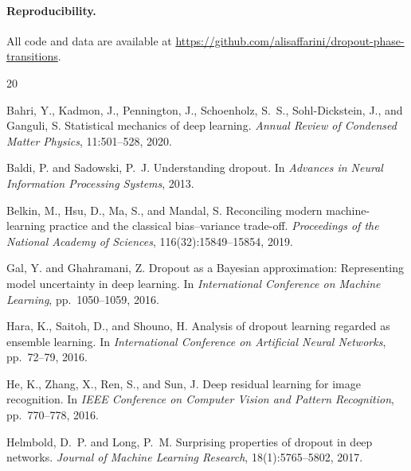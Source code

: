 \documentclass{article}
\begin{document}
\paragraph{Reproducibility.} All code and data are available at \url{https://github.com/alisaffarini/dropout-phase-transitions}.




\begin{thebibliography}{20}

Bahri, Y., Kadmon, J., Pennington, J., Schoenholz, S.~S., Sohl-Dickstein, J., and Ganguli, S.
\newblock Statistical mechanics of deep learning.
\newblock \emph{Annual Review of Condensed Matter Physics}, 11:501--528, 2020.

Baldi, P. and Sadowski, P.~J.
\newblock Understanding dropout.
\newblock In \emph{Advances in Neural Information Processing Systems}, 2013.

Belkin, M., Hsu, D., Ma, S., and Mandal, S.
\newblock Reconciling modern machine-learning practice and the classical bias--variance trade-off.
\newblock \emph{Proceedings of the National Academy of Sciences}, 116(32):15849--15854, 2019.

Gal, Y. and Ghahramani, Z.
\newblock Dropout as a {B}ayesian approximation: Representing model uncertainty in deep learning.
\newblock In \emph{International Conference on Machine Learning}, pp.\ 1050--1059, 2016.

Hara, K., Saitoh, D., and Shouno, H.
\newblock Analysis of dropout learning regarded as ensemble learning.
\newblock In \emph{International Conference on Artificial Neural Networks}, pp.\ 72--79, 2016.

He, K., Zhang, X., Ren, S., and Sun, J.
\newblock Deep residual learning for image recognition.
\newblock In \emph{IEEE Conference on Computer Vision and Pattern Recognition}, pp.\ 770--778, 2016.

Helmbold, D.~P. and Long, P.~M.
\newblock Surprising properties of dropout in deep networks.
\newblock \emph{Journal of Machine Learning Research}, 18(1):5765--5802, 2017.


\end{thebibliography}
\end{document}
